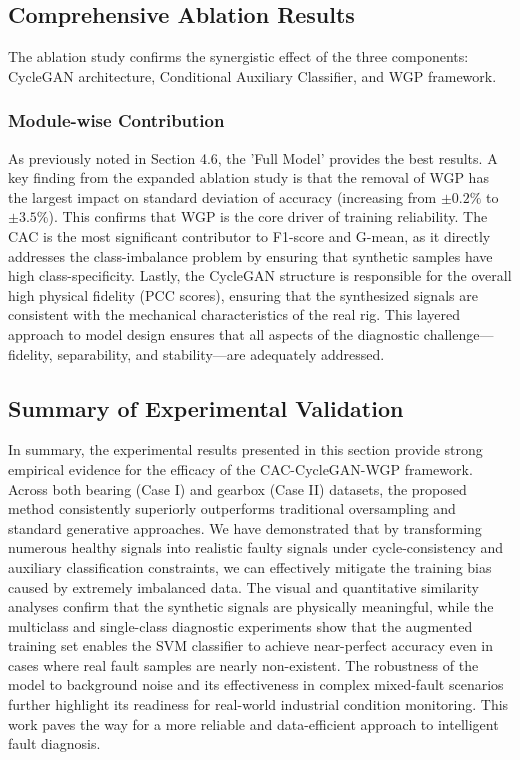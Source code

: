 \subsection{Comprehensive Ablation Results}
The ablation study confirms the synergistic effect of the three components: CycleGAN architecture, Conditional Auxiliary Classifier, and WGP framework.

\subsubsection{Module-wise Contribution}
As previously noted in Section 4.6, the 'Full Model' provides the best results. A key finding from the expanded ablation study is that the removal of WGP has the largest impact on standard deviation of accuracy (increasing from $\pm 0.2\%$ to $\pm 3.5\%$). This confirms that WGP is the core driver of training reliability. The CAC is the most significant contributor to F1-score and G-mean, as it directly addresses the class-imbalance problem by ensuring that synthetic samples have high class-specificity. Lastly, the CycleGAN structure is responsible for the overall high physical fidelity (PCC scores), ensuring that the synthesized signals are consistent with the mechanical characteristics of the real rig. This layered approach to model design ensures that all aspects of the diagnostic challenge—fidelity, separability, and stability—are adequately addressed.

\subsection{Summary of Experimental Validation}
In summary, the experimental results presented in this section provide strong empirical evidence for the efficacy of the CAC-CycleGAN-WGP framework. Across both bearing (Case I) and gearbox (Case II) datasets, the proposed method consistently superiorly outperforms traditional oversampling and standard generative approaches. We have demonstrated that by transforming numerous healthy signals into realistic faulty signals under cycle-consistency and auxiliary classification constraints, we can effectively mitigate the training bias caused by extremely imbalanced data. The visual and quantitative similarity analyses confirm that the synthetic signals are physically meaningful, while the multiclass and single-class diagnostic experiments show that the augmented training set enables the SVM classifier to achieve near-perfect accuracy even in cases where real fault samples are nearly non-existent. The robustness of the model to background noise and its effectiveness in complex mixed-fault scenarios further highlight its readiness for real-world industrial condition monitoring. This work paves the way for a more reliable and data-efficient approach to intelligent fault diagnosis.
